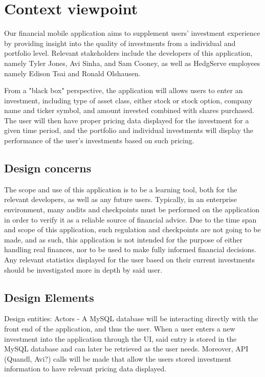\documentclass[onecolumn, draftclsnofoot,10pt, compsoc]{IEEEtran}
\begin{document}
\section{Context viewpoint}
	Our financial mobile application aims to supplement users' investment experience by providing insight into the quality of investments from a individual and portfolio level. 
	Relevant stakeholders include the developers of this application, namely Tyler Jones, Avi Sinha, and Sam Cooney, as well as HedgServe employees namely Edison Tsai and Ronald Olshausen.

	From a "black box" perspective, the application will allows users to enter an investment, including type of asset class, either stock or stock option, company name and ticker symbol, 
	and amount invested combined with shares purchased. The user will then have proper pricing data displayed for the investment for a given time period, and the portfolio and individual 
	investments will display the performance of the user's investments based on such pricing.

\subsection{Design concerns}
	The scope and use of this application is to be a learning tool, both for the relevant developers, as well as any future users. Typically, in an enterprise environment, many audits and 
	checkpoints must be performed on the application in order to verify it as a reliable source of financial advice. Due to the time span and scope of this application, such regulation and 
	checkpoints are not going to be made, and as such, this application is not intended for the purpose of either handling real finances, nor to be used to make fully informed financial decisions. 
	Any relevant statistics displayed for the user based on their current investments should be investigated more in depth by said user.

\subsection{Design Elements}
	Design entities: Actors - A MySQL database will be interacting directly with the front end of the application, and thus the user. When a user enters a new investment into the application 
	through the UI, said entry is stored in the MySQL database and can later be retrieved as the user needs. Moreover, API (Quandl, Avi?) calls will be made that allow the users stored investment 
	information to have relevant pricing data displayed.
\end{document}
